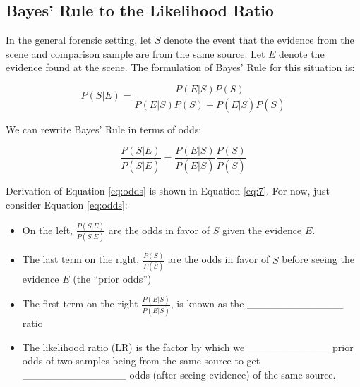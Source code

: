 \documentclass[]{book}
\providecommand{\tightlist}{%
  \setlength{\itemsep}{0pt}\setlength{\parskip}{0pt}}
\theoremstyle{definition}
\theoremstyle{definition}
\theoremstyle{remark}
\begin{document}
\subsection{Bayes' Rule to the Likelihood
Ratio}\label{bayes-rule-to-the-likelihood-ratio}

In the general forensic setting, let \(S\) denote the event that the
evidence from the scene and comparison sample are from the same source.
Let \(E\) denote the evidence found at the scene. The formulation of
Bayes' Rule for this situation is:

\[ P(S|E) = \frac{P(E|S)P(S)}{P(E|S)P(S) + P(E|\overline{S})P(\overline{S})}\]

We can rewrite Bayes' Rule in terms of odds:

\begin{equation}\label{eq:odds}
\frac{P(S|E)}{P(\overline{S}|E)} = \frac{P(E|S)}{P(E|\overline{S})}\frac{P(S)}{P(\overline{S})}
\end{equation}

Derivation of Equation \ref{eq:odds} is shown in Equation \ref{eq:7}.
For now, just consider Equation \ref{eq:odds}:

\begin{itemize}
\tightlist
\item
  On the left, \(\frac{P(S|E)}{P(\overline{S}|E)}\) are the odds in
  favor of \(S\) given the evidence \(E\).
\item
  The last term on the right, \(\frac{P(S)}{P(\overline{S})}\) are the
  odds in favor of \(S\) before seeing the evidence \(E\) (the ``prior
  odds'') \vspace{.1in}
\item
  The first term on the right \(\frac{P(E|S)}{P(E|\overline{S})}\), is
  known as the \_\_\_\_\_\_\_\_\_\_\_\_\_ ratio \vspace{.1in}
\item
  The likelihood ratio (LR) is the factor by which we
  \_\_\_\_\_\_\_\_\_\_\_ prior odds of two samples being from the same
  source to get \_\_\_\_\_\_\_\_\_\_\_\_\_\_ odds (after seeing
  evidence) of the same source.
\end{itemize}
\end{document}
